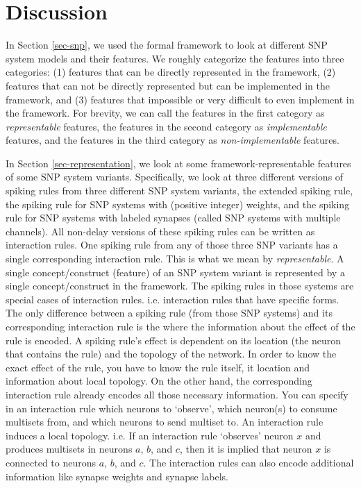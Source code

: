 \documentclass[a4paper]{article}
\theoremstyle{definition}
\begin{document}


\section{Discussion}\label{sec-discussion}

In Section \ref{sec-snp}, we used the formal framework to look at different SNP system models and
their features. We roughly categorize the features into three categories: (1) features that can be
directly represented in the framework, (2) features that can not be directly represented but can be
implemented in the framework, and (3) features that impossible or very difficult to even implement
in the framework. For brevity, we can call the features in the first category as 
\emph{representable} features, the features in the second category as \emph{implementable} features, 
and the features in the third category as \emph{non-implementable} features. 

In Section \ref{sec-representation}, we look at some framework-representable features of some
SNP system variants. Specifically, we look at three different versions of spiking rules from three
different SNP system variants, the extended spiking rule, the spiking rule for SNP systems with
(positive integer) weights, and the spiking rule for SNP systems with labeled synapses (called SNP
systems with multiple channels). All non-delay versions of these spiking rules can be written as
interaction rules. One spiking rule from any of those three SNP variants has a single corresponding
interaction rule. This is what we mean by \emph{representable}. A single concept/construct (feature)
of an SNP system variant is represented by a single concept/construct in the framework. The spiking
rules in those systems are special cases of interaction rules. i.e. interaction rules that have
specific forms. The only difference between a spiking rule (from those SNP systems) and its
corresponding interaction rule is the where the information about the effect of the rule is encoded.
A spiking rule's effect is dependent on its location (the neuron that contains the rule) and the
topology of the network. In order to know the exact effect of the rule, you have to know the rule
itself, it location and information about local topology. On the other hand, the corresponding 
interaction rule already encodes all those necessary information. You can specify in an interaction
rule which neurons to `observe', which neuron(s) to consume multisets from, and which neurons to
send multiset to. An interaction rule induces a local topology. i.e. If an interaction rule 
`observes' neuron $x$ and produces multisets in neurons $a$, $b$, and $c$, then it is implied that
neuron $x$ is connected to neurons $a$, $b$, and $c$. The interaction rules can also encode 
additional information like synapse weights and synapse labels.
\end{document}
